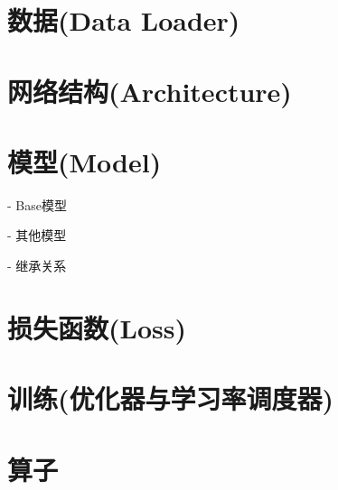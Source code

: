 \documentclass[../main.tex]{subfiles}
\begin{document}
	
	\section{数据(Data Loader)}
	
	\section{网络结构(Architecture)}
	
	\section{模型(Model)}
	
	- Base模型
	
	- 其他模型
	
	- 继承关系
	
	\section{损失函数(Loss)}
	
	\section{训练(优化器与学习率调度器)}
	
	\section{算子}
	
\end{document}
